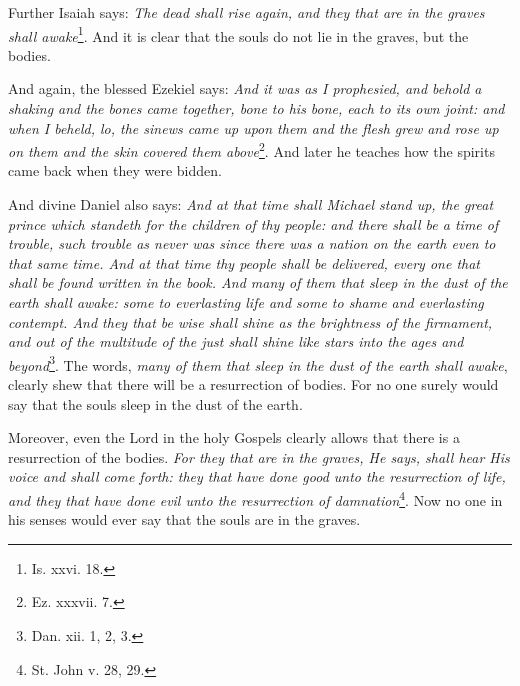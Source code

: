 Further Isaiah says: \emph{The dead shall rise again, and they that are in the graves shall awake}\footnote{Is. xxvi. 18.}. And it is clear that the souls do not lie in the graves, but the bodies.

And again, the blessed Ezekiel says: \emph{And it was as I prophesied, and behold a shaking and the bones came together, bone to his bone, each to its own joint: and when I beheld, lo, the sinews came up upon them and the flesh grew and rose up on them and the skin covered them above}\footnote{Ez. xxxvii. 7.}. And later he teaches how the spirits came back when they were bidden.

And divine Daniel also says: \emph{And at that time shall Michael stand up, the great prince which standeth for the children of thy people: and there shall be a time of trouble, such trouble as never was since there was a nation on the earth even to that same time. And at that time thy people shall be delivered, every one that shall be found written in the book. And many of them that sleep in the dust of the earth shall awake: some to everlasting life and some to shame and everlasting contempt. And they that be wise shall shine as the brightness of the firmament, and out of the multitude of the just shall shine like stars into the ages and beyond}\footnote{Dan. xii. 1, 2, 3.}. The words, \emph{many of them that sleep in the dust of the earth shall awake}, clearly shew that there will be a resurrection of bodies. For no one surely would say that the souls sleep in the dust of the earth.

Moreover, even the Lord in the holy Gospels clearly allows that there is a resurrection of the bodies. \emph{For they that are in the graves, He says, shall hear His voice and shall come forth: they that have done good unto the resurrection of life, and they that have done evil unto the resurrection of damnation}\footnote{St. John v. 28, 29.}. Now no one in his senses would ever say that the souls are in the graves.

